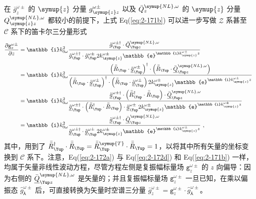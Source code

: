 在 $\bar{g}^{\omega\pm}_z$ 的 $\symup{z}$ 分量 $g^{\omega\pm}_{\symup{z} z}$ 以及 $\bar{Q}^{{\symup{NL}},\omega}_{z}$ 的 $\symup{z}$ 分量 $Q^{{\symup{NL}},\omega}_{\symup{z} z}$ 都较小的前提下，上式 Eq(\ref{eq:2-171b}) 可以进一步写做 $\mathcal{Z}$ 系甚至 $\mathcal{C}$ 系下的笛卡尔三分量形式
\begin{subequations} \label{eq:2-172}
	\abovedisplayskip=10pt
	\belowdisplayskip=10pt
	\begin{align}
		\displaystyle{\frac{\partial {\mathtt{g}}^{\omega\pm}_{z}}{\partial z}} &= \mathbb{i} k^{2}_{0\omega} \frac{\hat{g}^{\omega\pm\dag}_{\Yup} \cdot \bar{Q}^{{\symup{NL}},\omega}_{\Yup z}}{ \hat{g}^{\omega\pm\dag}_{\Yup} \cdot \hat{g}^{\omega\pm}_{\Yup} 2 k^{\omega\pm}_{\symup{z}} \mathbb{e}^{\mathbb{i} k^{\omega\pm}_{\symup{z}} z} } \label{eq:2-172a} \\ &= \mathbb{i} k^{2}_{0\omega} \frac{ \left( \bar{\bar{R}}_{\Yup} \cdot \hat{\underline{g}}^{\omega\pm}_{\Yup} \right)^{\dag} \cdot \left( \bar{\bar{R}}_{\Yup} \cdot \bar{\underline{Q}}^{{\symup{NL}},\omega}_{\Yup z} \right) }{ \left( \bar{\bar{R}}_{\Yup} \cdot \hat{\underline{g}}^{\omega\pm}_{\Yup} \right)^{\dag} \cdot \left( \bar{\bar{R}}_{\Yup} \cdot \hat{\underline{g}}^{\omega\pm}_{\Yup} \right) 2 k^{\omega\pm}_{\symup{z}} \mathbb{e}^{\mathbb{i} k^{\omega\pm}_{\symup{z}} z}} \label{eq:2-172b} \\ &= \mathbb{i} k^{2}_{0\omega} \frac{ \hat{\underline{g}}^{\omega\pm\dag}_{\Yup} \cdot \left( \bar{\bar{R}}^{\dag}_{\Yup} \cdot \bar{\bar{R}}_{\Yup} \right) \cdot \bar{\underline{Q}}^{{\symup{NL}},\omega}_{\Yup z} }{ \hat{\underline{g}}^{\omega\pm\dag}_{\Yup} \cdot \left( \bar{\bar{R}}^{\dag}_{\Yup} \cdot \bar{\bar{R}}_{\Yup} \right) \cdot \hat{\underline{g}}^{\omega\pm}_{\Yup} 2 k^{\omega\pm}_{\symup{z}} \mathbb{e}^{\mathbb{i} k^{\omega\pm}_{\symup{z}} z} } \label{eq:2-172c} \\ &= \mathbb{i} k^{2}_{0\omega} \frac{ \hat{\underline{g}}^{\omega\pm\dag}_{\Yup} \cdot \bar{\underline{Q}}^{{\symup{NL}},\omega}_{\Yup z} }{ \hat{\underline{g}}^{\omega\pm\dag}_{\Yup} \cdot \hat{\underline{g}}^{\omega\pm}_{\Yup} 2 k^{\omega\pm}_{\symup{z}} \mathbb{e}^{\mathbb{i} k^{\omega\pm}_{\symup{z}} z} } \label{eq:2-172d}~,
	\end{align}
\end{subequations}
其中，用到了 $\bar{\bar{R}}^{\dag}_{\Yup} \cdot \bar{\bar{R}}_{\Yup} = \bar{\bar{R}}_{\Yup}^{\symup{T}} \cdot \bar{\bar{R}}_{\Yup} = 1$，以将其中所有矢量的坐标变换到 $\mathcal{C}$ 系下。注意，Eq(\ref{eq:2-172a}) 与 Eq(\ref{eq:2-172d}) 和 Eq(\ref{eq:2-171b}) 一样，均属于矢量非线性波动方程，尽管方程左侧是复振幅标量场 ${\mathtt{g}}^{\omega\pm}_{z}$ 的 $z$ 向偏导：因为右侧的 $\bar{\underline{Q}}^{{\symup{NL}},\omega}_{\Yup z}$ 是矢量的；并且复振幅标量场 ${\mathtt{g}}^{\omega\pm}_{z}$ 一旦已知，在乘以偏振态 $\hat{g}^{\omega\pm}_{\Yup}$ 后，可直接转换为矢量时空谱三分量 $\bar{g}^{\omega\pm}_{z} = {\mathtt{g}}^{\omega\pm}_{z} \cdot \hat{g}^{\omega\pm}_{\Yup}$。

